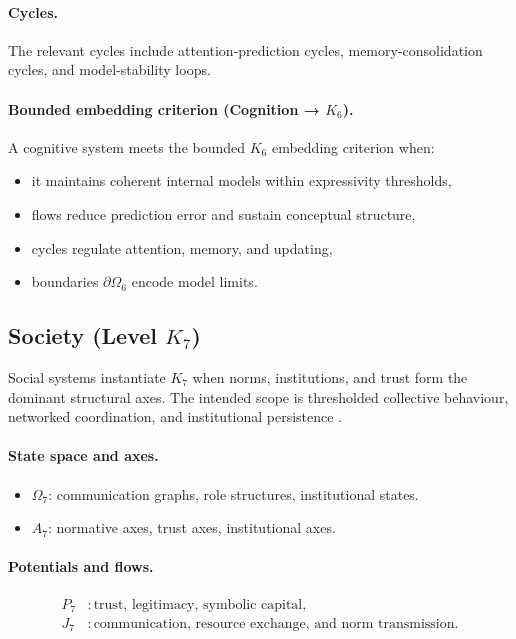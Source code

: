 \paragraph{Cycles.}
The relevant cycles include attention-prediction cycles, memory-consolidation
cycles, and model-stability loops.

\paragraph{Bounded embedding criterion (Cognition → \texorpdfstring{\(K_6\)}{K6}).}
A cognitive system meets the bounded \(K_6\) embedding criterion when:
\begin{itemize}
  \item it maintains coherent internal models within expressivity thresholds,
  \item flows reduce prediction error and sustain conceptual structure,
  \item cycles regulate attention, memory, and updating,
  \item boundaries \(\partial\Omega_6\) encode model limits.
\end{itemize}

\subsection{Society (Level \texorpdfstring{$K_7$}{K7})}

Social systems instantiate \(K_7\) when norms, institutions, and trust form the
dominant structural axes.
The intended scope is thresholded collective behaviour, networked coordination,
and institutional persistence \parencite{granovetter_threshold,schelling_micromotives,newman_networks}.

\paragraph{State space and axes.}
\begin{itemize}
  \item \(\Omega_7\): communication graphs, role structures, institutional
        states.
  \item \(A_7\): normative axes, trust axes, institutional axes.
\end{itemize}

\paragraph{Potentials and flows.}
\[
\begin{aligned}
  P_7 &: \text{trust, legitimacy, symbolic capital},\\
  J_7 &: \text{communication, resource exchange, and norm transmission}.
\end{aligned}
\]

